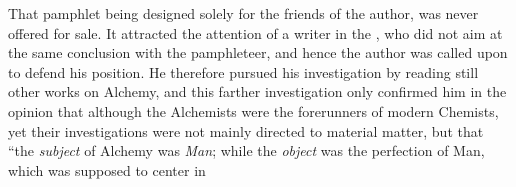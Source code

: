 That pamphlet being designed solely for the friends of the author, was
never offered for sale. It attracted the attention of a writer in the
, who did not aim at the same conclusion with
the pamphleteer, and hence the author was called upon to defend his
position. He therefore pursued his investigation by reading still
other works on Alchemy, and this farther investigation only confirmed
him in the opinion that although the Alchemists were the forerunners
of modern Chemists, yet their investigations were not mainly directed
to material matter, but that ``the \emph{subject} of Alchemy was \emph{Man}; while
the \emph{object} was the perfection of Man, which was supposed to center in\endinput
